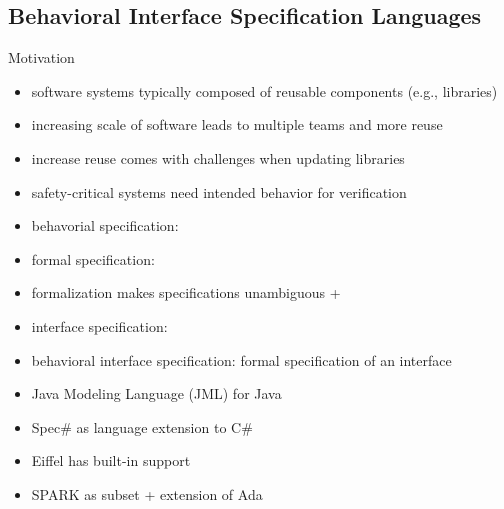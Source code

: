 \subsection{Behavioral Interface Specification Languages}
\begin{frame}{\insertsubsection{} \mytitlesource{\hatcliff}}
	\begin{fancycolumns}[widths={30}]
		\begin{note}{Motivation}
			\begin{itemize}
				\item software systems typically composed of reusable components (e.g., libraries)
				\item increasing scale of software leads to multiple teams and more reuse
				\item increase reuse comes with challenges when updating libraries
				\item safety-critical systems need intended behavior for verification %
			\end{itemize}
		\end{note}
	\nextcolumn
		\begin{definition}{\insertsubsection}
			\begin{itemize}
				\item behavorial specification: 
				\item formal specification: 
				\item formalization makes specifications unambiguous + 
				\item interface specification: 
				\item behavioral interface specification: formal specification of an interface
			\end{itemize}
		\end{definition}
		\begin{example}{}
			\begin{itemize}
				\item Java Modeling Language (JML) for Java
				\item Spec\# as language extension to C\#
				\item Eiffel has built-in support
				\item SPARK as subset + extension of Ada
			\end{itemize}
		\end{example}
	\end{fancycolumns}
\end{frame}

